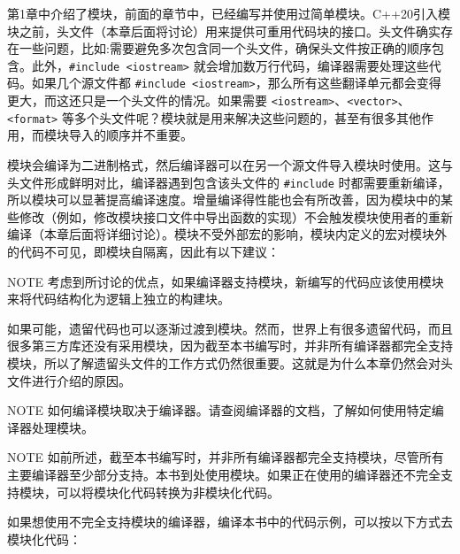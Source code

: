 
第1章中介绍了模块，前面的章节中，已经编写并使用过简单模块。C++20引入模块之前，头文件（本章后面将讨论）用来提供可重用代码块的接口。头文件确实存在一些问题，比如:需要避免多次包含同一个头文件，确保头文件按正确的顺序包含。此外，\verb|#include <iostream>| 就会增加数万行代码，编译器需要处理这些代码。如果几个源文件都 \verb|#include <iostream>|，那么所有这些翻译单元都会变得更大，而这还只是一个头文件的情况。如果需要 \verb|<iostream>|、\verb|<vector>|、\verb|<format>| 等多个头文件呢？模块就是用来解决这些问题的，甚至有很多其他作用，而模块导入的顺序并不重要。

模块会编译为二进制格式，然后编译器可以在另一个源文件导入模块时使用。这与头文件形成鲜明对比，编译器遇到包含该头文件的 \verb|#include| 时都需要重新编译，所以模块可以显著提高编译速度。增量编译得性能也会有所改善，因为模块中的某些修改（例如，修改模块接口文件中导出函数的实现）不会触发模块使用者的重新编译（本章后面将详细讨论）。模块不受外部宏的影响，模块内定义的宏对模块外的代码不可见，即模块自隔离，因此有以下建议：

\begin{myNotic}{NOTE}
考虑到所讨论的优点，如果编译器支持模块，新编写的代码应该使用模块来将代码结构化为逻辑上独立的构建块。
\end{myNotic}

如果可能，遗留代码也可以逐渐过渡到模块。然而，世界上有很多遗留代码，而且很多第三方库还没有采用模块，因为截至本书编写时，并非所有编译器都完全支持模块，所以了解遗留头文件的工作方式仍然很重要。这就是为什么本章仍然会对头文件进行介绍的原因。

\begin{myNotic}{NOTE}
如何编译模块取决于编译器。请查阅编译器的文档，了解如何使用特定编译器处理模块。
\end{myNotic}

\begin{myNotic}{NOTE}
如前所述，截至本书编写时，并非所有编译器都完全支持模块，尽管所有主要编译器至少部分支持。本书到处使用模块。如果正在使用的编译器还不完全支持模块，可以将模块化代码转换为非模块化代码。
\end{myNotic}


如果想使用不完全支持模块的编译器，编译本书中的代码示例，可以按以下方式去模块化代码：

